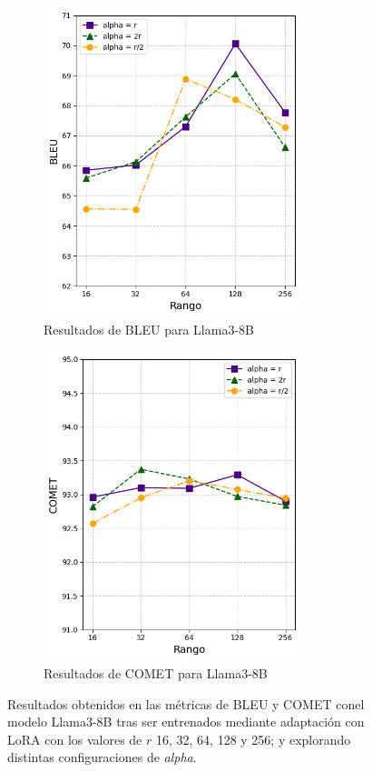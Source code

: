 \documentclass[11pt,spanish,listoffigures,listoftables]{tfgetsinf}
\begin{document}
\begin{figure}[!h]

\begin{subfigure}{0.5\textwidth}
\includegraphics[width=0.9\linewidth, height=9cm]{images/llama_BLEU} 
\caption{Resultados de BLEU para Llama3-8B}
\label{fig:subim1}
\end{subfigure}
\begin{subfigure}{0.5\textwidth}
\includegraphics[width=0.9\linewidth, height=9cm]{images/llama_COMET}
\caption{Resultados de COMET para Llama3-8B}
\label{fig:subim2}
\end{subfigure}

\caption{Resultados obtenidos en las métricas de BLEU y COMET conel modelo Llama3-8B tras ser entrenados mediante adaptación con LoRA con los valores de $r$ 16, 32, 64, 128 y 256;  y explorando distintas configuraciones de \textit{alpha}.}
\label{fig:graficasLlama}
\end{figure}
\end{document}
